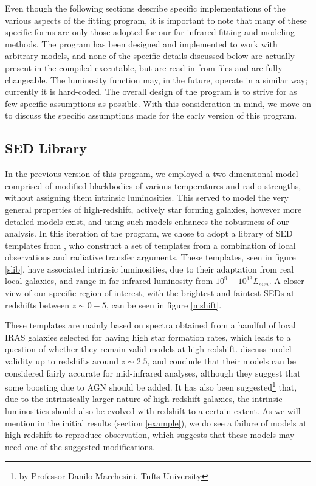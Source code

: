 \documentclass[twocolumn,letterpaper,10pt]{article}
\begin{document}
Even though the following sections describe specific implementations of the various aspects of the fitting program, it is important to note that many of these specific forms are only those adopted for our far-infrared fitting and modeling methods. The program has been designed and implemented to work with arbitrary models, and none of the specific details discussed below are actually present in the compiled executable, but are read in from files and are fully changeable. The luminosity function may, in the future, operate in a similar way; currently it is hard-coded. The overall design of the program is to strive for as few specific assumptions as possible. With this consideration in mind, we move on to discuss the specific assumptions made for the early version of this program.

\subsection{SED Library}\label{sec:SED}

In the previous version of this program, we employed a two-dimensional model comprised of modified blackbodies of various temperatures and radio strengths, without assigning them intrinsic luminosities. This served to model the very general properties of high-redshift, actively star forming galaxies, however more detailed models exist, and using such models enhances the robustness of our analysis. In this iteration of the program, we chose to adopt a library of SED templates from \citet{rieke09}, who construct a set of templates from a combination of local observations and radiative transfer arguments. These templates, seen in figure \ref{slib}, have associated intrinsic luminosities, due to their adaptation from real local galaxies, and range in far-infrared luminosity from $10^9 - 10^{13} L_{sun}$. A closer view of our specific region of interest, with the brightest and faintest SEDs at redshifts between $z\sim 0-5$, can be seen in figure \ref{mshift}.

These templates are mainly based on spectra obtained from a handful of local IRAS galaxies selected for having high star formation rates, which leads to a question of whether they remain valid models at high redshift. \citet{rieke09} discuss model validity up to redshifts around $z\sim2.5$, and conclude that their models can be considered fairly accurate for mid-infrared analyses, although they suggest that some boosting due to AGN should be added. It has also been suggested\footnote{by Professor Danilo Marchesini, Tufts University} that, due to the intrinsically larger nature of high-redshift galaxies, the intrinsic luminosities should also be evolved with redshift to a certain extent. As we will mention in the initial results (section \ref{example}), we do see a failure of models at high redshift to reproduce observation, which suggests that these models may need one of the suggested modifications. 
\end{document}
